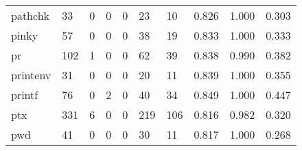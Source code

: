 \begin{longtable}{lp{1.3cm}p{1.3cm}p{1.3cm}p{1.3cm}p{1.3cm}p{1.3cm}p{1.3cm}p{1.3cm}p{1.3cm}}
pathchk   &                     33 &                                             0 &                                            0 &                                           0 &                                           23 &                                         10 &                                0.826 &                                  1.000 &                                0.303 \\
pinky     &                     57 &                                             0 &                                            0 &                                           0 &                                           38 &                                         19 &                                0.833 &                                  1.000 &                                0.333 \\
pr        &                    102 &                                             1 &                                            0 &                                           0 &                                           62 &                                         39 &                                0.838 &                                  0.990 &                                0.382 \\
printenv  &                     31 &                                             0 &                                            0 &                                           0 &                                           20 &                                         11 &                                0.839 &                                  1.000 &                                0.355 \\
printf    &                     76 &                                             0 &                                            2 &                                           0 &                                           40 &                                         34 &                                0.849 &                                  1.000 &                                0.447 \\
ptx       &                    331 &                                             6 &                                            0 &                                           0 &                                          219 &                                        106 &                                0.816 &                                  0.982 &                                0.320 \\
pwd       &                     41 &                                             0 &                                            0 &                                           0 &                                           30 &                                         11 &                                0.817 &                                  1.000 &                                0.268 \\

\end{longtable}
